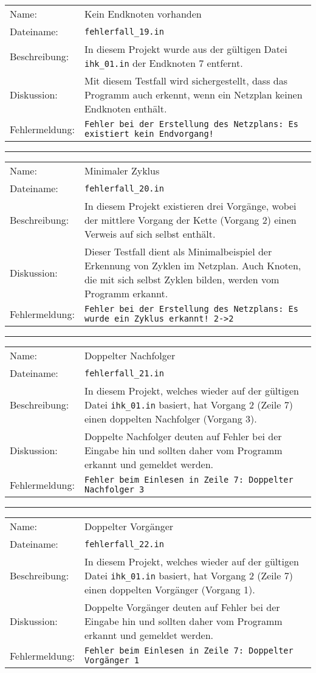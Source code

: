 \begin{tabularx}{\textwidth}{l X}
  Name: & Kein Endknoten vorhanden \\
  Dateiname: & \texttt{fehlerfall\_19.in} \\
  Beschreibung: & In diesem Projekt wurde aus der g\"ultigen Datei
  \texttt{ihk\_01.in} der Endknoten 7 entfernt.\\
  Diskussion: & Mit diesem Testfall wird sichergestellt, dass das
  Programm auch erkennt, wenn ein Netzplan keinen Endknoten
  enth\"alt.\\
  Fehlermeldung: & \texttt{Fehler bei der Erstellung des Netzplans: Es
    existiert kein Endvorgang!} \\
\end{tabularx}
\hrule
\begin{tabularx}{\textwidth}{l X}
  Name: & Minimaler Zyklus \\
  Dateiname: & \texttt{fehlerfall\_20.in} \\
  Beschreibung: & In diesem Projekt existieren drei Vorg\"ange, wobei
  der mittlere Vorgang der Kette (Vorgang 2) einen Verweis auf sich
  selbst enth\"alt.\\
  Diskussion: & Dieser Testfall dient als Minimalbeispiel der
  Erkennung von Zyklen im Netzplan. Auch Knoten, die mit sich selbst
  Zyklen bilden, werden vom Programm erkannt.\\
  Fehlermeldung: & \texttt{Fehler bei der Erstellung des Netzplans: Es wurde ein Zyklus erkannt!
    2->2} \\
\end{tabularx}
\hrule
\begin{tabularx}{\textwidth}{l X}
  Name: & Doppelter Nachfolger \\
  Dateiname: & \texttt{fehlerfall\_21.in} \\
  Beschreibung: & In diesem Projekt, welches wieder auf der g\"ultigen
  Datei \texttt{ihk\_01.in} basiert, hat Vorgang 2 (Zeile 7) einen doppelten
  Nachfolger (Vorgang 3).\\
  Diskussion: & Doppelte Nachfolger deuten auf Fehler bei der Eingabe
  hin und sollten daher vom Programm erkannt und gemeldet werden.\\
  Fehlermeldung: & \texttt{Fehler beim Einlesen in Zeile 7: Doppelter
    Nachfolger 3} \\
\end{tabularx}
\hrule
\begin{tabularx}{\textwidth}{l X}
  Name: & Doppelter Vorg\"anger \\
  Dateiname: & \texttt{fehlerfall\_22.in} \\
  Beschreibung: & In diesem Projekt, welches wieder auf der g\"ultigen
  Datei \texttt{ihk\_01.in} basiert, hat Vorgang 2 (Zeile 7) einen doppelten
  Vorg\"anger (Vorgang 1).\\
  Diskussion: & Doppelte Vorg\"anger deuten auf Fehler bei der Eingabe
  hin und sollten daher vom Programm erkannt und gemeldet werden.\\
  Fehlermeldung: & \texttt{Fehler beim Einlesen in Zeile 7: Doppelter
    Vorgänger 1} \\
\end{tabularx}
